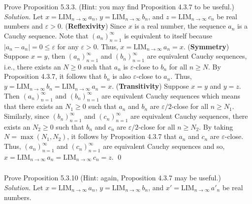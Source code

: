 \documentclass{amsart}
\theoremstyle{definition}
\newcommand{\soln}{\newline\textit{Solution.} }
\newcommand{\LIM}{\mathrm{LIM}_{n\to\infty}\,}
\begin{document}
\subsubsection{} Prove Proposition 5.3.3. (Hint: you may find Proposition 4.3.7 to be useful.) \\
\soln Let $x=\LIM a_n$, $y=\LIM b_n$, and $z=\LIM c_n$ be real numbers and $\varepsilon>0$. (\textbf{Reflexivity}) Since $x$ is a real number, the sequence $a_n$ is a Cauchy sequence. Note that $(a_n)_{n=1}^\infty$ is equivalent to itself because $|a_n-a_n|=0\leq\varepsilon$ for any $\varepsilon>0$. Thus, $x=\LIM a_n=x$. (\textbf{Symmetry}) Suppose $x=y$, then $(a_n)_{n=1}^\infty$ and $(b_n)_{n=1}^\infty$ are equivalent Cauchy sequences, i.e., there exists an $N\geq 0$ such that $a_n$ is $\varepsilon$-close to $b_n$ for all $n\geq N$. By Proposition 4.3.7, it follows that $b_n$ is also $\varepsilon$-close to $a_n$. Thus, $y=\LIM b_n=\LIM a_n=x$. (\textbf{Transitivity}) Suppose $x=y$ and $y=z$. Then $(a_n)_{n=1}^\infty$ and $(b_n)_{n=1}^\infty$ are equivalent Cauchy sequences which means that there exists an $N_1\geq0$ such that $a_n$ and $b_n$ are $\varepsilon/2$-close for all $n\geq N_1$. Similarly, since $(b_n)_{n=1}^\infty$ and $(c_n)_{n=1}^\infty$ are equivalent Cauchy sequences, there exists an $N_2\geq0$ such that $b_n$ and $c_n$ are $\varepsilon/2$-close for all $n\geq N_2$. By taking $N=\max (N_1,N_2)$, it follows by Proposition 4.3.7 that $a_n$ and $c_n$ are $\varepsilon$-close. Thus, $(a_n)_{n=1}^\infty$ and $(c_n)_{n=1}^\infty$ are equivalent Cauchy sequences and so, $x=\LIM a_n=\LIM c_n=z$. \qed \\

\subsubsection{} Prove Proposition 5.3.10 (Hint: again, Proposition 4.3.7 may be useful.) \\
\soln Let $x=\LIM a_n$, $y=\LIM b_n$, and $x'=\LIM a'_n$ be real numbers. \\
\end{document}
